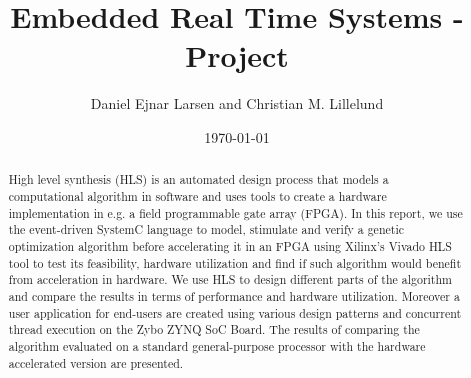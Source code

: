 \documentclass{article}
\title{Embedded Real Time Systems - Project}
\author{Daniel Ejnar Larsen and Christian M. Lillelund}
\date{\today}
\begin{document}
\maketitle
\begin{abstract}
	High level synthesis (HLS) is an automated design process that models a computational algorithm in software and uses tools to create a hardware implementation in e.g. a field programmable gate array (FPGA). In this report, we use the event-driven SystemC language to model, stimulate and verify a genetic optimization algorithm before accelerating it in an FPGA using Xilinx's Vivado HLS tool to test its feasibility, hardware utilization and find if such algorithm would benefit from acceleration in hardware. We use HLS to design different parts of the algorithm and compare the results in terms of performance and hardware utilization. Moreover a user application for end-users are created using various design patterns and concurrent thread execution on the Zybo ZYNQ SoC Board. The results of comparing the algorithm evaluated on a standard general-purpose processor with the hardware accelerated version are presented.
\end{abstract}






















\appendix


\end{document}
